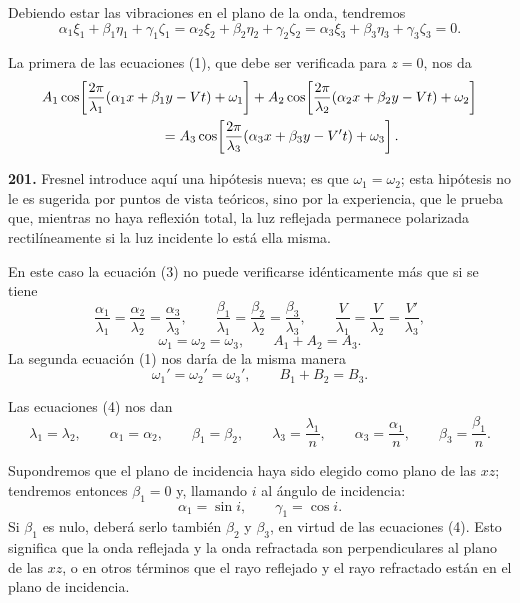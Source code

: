 Debiendo estar las vibraciones en el plano de la onda, tendremos
\begin{equation}
\alpha_1\xi_1+\beta_1\eta_1+\gamma_1\zeta_1
=\alpha_2\xi_2+\beta_2\eta_2+\gamma_2\zeta_2
=\alpha_3\xi_3+\beta_3\eta_3+\gamma_3\zeta_3=0.
\end{equation}

La primera de las ecuaciones (1), que debe ser verificada para $z=0$, nos
da
\begin{align}
&A_1\cos\!\left[\frac{2\pi}{\lambda_1}(\alpha_1x+\beta_1y-Vt)+\omega_1\right]
+A_2\cos\!\left[\frac{2\pi}{\lambda_2}(\alpha_2x+\beta_2y-Vt)+\omega_2\right]
\notag\\
&\hspace{3cm}=A_3\cos\!\left[\frac{2\pi}{\lambda_3}(\alpha_3x+\beta_3y-V't)+\omega_3\right].
\end{align}

\noindent\textbf{201.} Fresnel introduce aquí una hipótesis nueva; es que
$\omega_1=\omega_2$; esta hipótesis no le es sugerida por puntos de vista
teóricos, sino por la experiencia, que le prueba que, mientras no haya
reflexión total, la luz reflejada permanece polarizada rectilíneamente si
la luz incidente lo está ella misma.

En este caso la ecuación (3) no puede verificarse idénticamente más que si
se tiene
\begin{equation}
\frac{\alpha_1}{\lambda_1}=\frac{\alpha_2}{\lambda_2}=\frac{\alpha_3}{\lambda_3},
\qquad
\frac{\beta_1}{\lambda_1}=\frac{\beta_2}{\lambda_2}=\frac{\beta_3}{\lambda_3},
\qquad
\frac{V}{\lambda_1}=\frac{V}{\lambda_2}=\frac{V'}{\lambda_3},
\end{equation}
\[
\omega_1=\omega_2=\omega_3,
\qquad A_1+A_2=A_3.
\]
La segunda ecuación (1) nos daría de la misma manera
\[
\omega_1'=\omega_2'=\omega_3',\qquad B_1+B_2=B_3.
\]

Las ecuaciones (4) nos dan
\[
\lambda_1=\lambda_2,\qquad \alpha_1=\alpha_2,\qquad \beta_1=\beta_2,
\qquad \lambda_3=\frac{\lambda_1}{n},\qquad \alpha_3=\frac{\alpha_1}{n},
\qquad \beta_3=\frac{\beta_1}{n}.
\]

Supondremos que el plano de incidencia haya sido elegido como plano de
las $xz$; tendremos entonces $\beta_1=0$ y, llamando $i$ al ángulo de
incidencia:
\[
\alpha_1=\sin i,\qquad \gamma_1=\cos i.
\]
Si $\beta_1$ es nulo, deberá serlo también $\beta_2$ y $\beta_3$, en
virtud de las ecuaciones (4). Esto significa que la onda reflejada y la
onda refractada son perpendiculares al plano de las $xz$, o en otros
términos que el rayo reflejado y el rayo refractado están en el plano de
incidencia.

